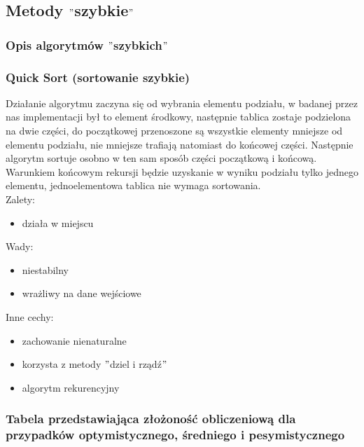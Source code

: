 \documentclass[polish,polish,a4paper]{article}
\begin{document}
\begin{spacing}{1.5}
	\subsection{Metody $"$szybkie$"$}

	\subsubsection{Opis algorytmów $"$szybkich$"$}

		\subsubsection*{Quick Sort (sortowanie szybkie)}
		Działanie algorytmu zaczyna się od wybrania elementu podziału, w badanej przez nas implementacji był to element środkowy, następnie tablica zostaje podzielona na dwie części, do początkowej przenoszone są wszystkie elementy mniejsze od elementu podziału, nie mniejsze trafiają natomiast do końcowej części. Następnie algorytm sortuje osobno w ten sam sposób części początkową i końcową. Warunkiem końcowym rekursji będzie uzyskanie w wyniku podziału tylko jednego elementu, jednoelementowa tablica nie wymaga sortowania.\\
		
	Zalety:
	\begin{itemize}
		\item działa w miejscu
	\end{itemize}
	Wady:
	\begin{itemize}
		\item niestabilny
		\item wrażliwy na dane wejściowe 
	\end{itemize}
	Inne cechy:
	\begin{itemize}
		\item zachowanie nienaturalne
		\item korzysta z metody $"$dziel i rządź$"$
		\item algorytm rekurencyjny
	\end{itemize}
	
	\subsubsection*{Tabela przedstawiająca złożoność obliczeniową dla przypadków optymistycznego, średniego i pesymistycznego} 
	\begin{figure}[H]
		
		\begin{equation*}
		\begin{array}{l|c|c|c|}


\end{array}
\end{equation*}
\end{figure}
\end{spacing}
\end{document}

